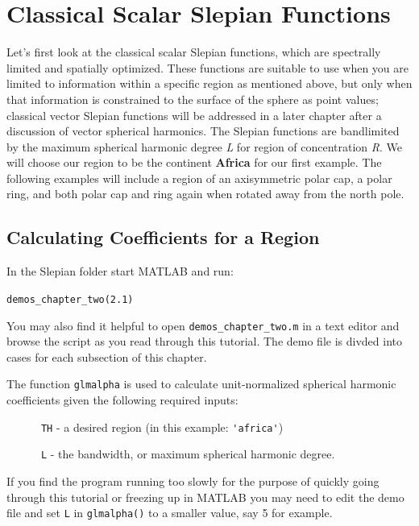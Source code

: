 \documentclass[11pt]{article}
\begin{document}
\section{Classical Scalar Slepian Functions}
%
Let's first look at the classical scalar Slepian functions, which are spectrally limited and spatially optimized. These functions are suitable to use when you are limited to information within a specific region as mentioned above, but only when that information is constrained to the surface of the sphere as point values; classical vector Slepian functions will be addressed in a later chapter after a discussion of vector spherical harmonics. The Slepian functions are bandlimited by the maximum spherical harmonic degree \textit{L} for region of concentration \textit{R}. We will choose our region to be the continent \textbf{Africa} for our first example. The following examples will include a region of an axisymmetric polar cap, a polar ring, and both polar cap and ring again when rotated away from the north pole.

\subsection{Calculating Coefficients for a Region}

In the Slepian folder start MATLAB and run: 

\verb|demos_chapter_two(2.1)|

You may also find it helpful to open \verb|demos_chapter_two.m| in a text editor and browse the script as you read through this tutorial. The demo file is divded into cases for each subsection of this chapter. 

The function \verb+glmalpha+ is used to calculate unit-normalized spherical harmonic coefficients given the following required inputs:

\verb+		TH+ - a desired region (in this example: \verb+'africa'+)

\verb+		L+ - the bandwidth, or maximum spherical harmonic degree. 

If you find the program running too slowly for the purpose of quickly going through this tutorial or freezing up in MATLAB you may need to edit the demo file and set \verb|L| in \verb|glmalpha()| to a smaller value, say 5 for example.
\end{document}
